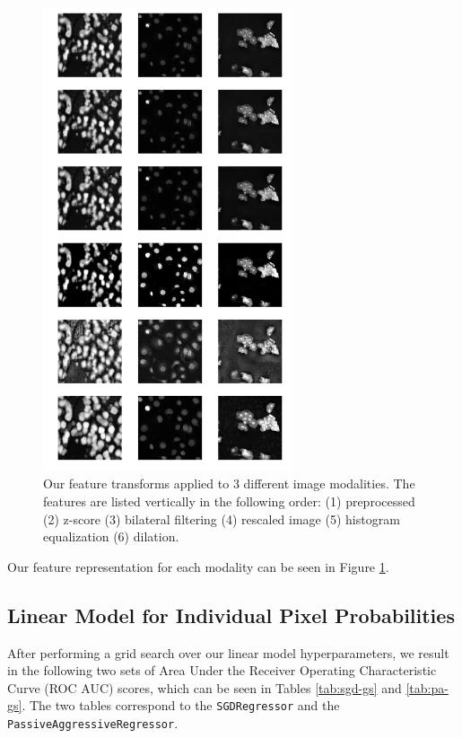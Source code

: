 \documentclass[paper=letter, fontsize=12pt]{article}
\numberwithin{equation}{section} %
\numberwithin{figure}{section} %
\numberwithin{table}{section} %
\begin{document}
\begin{figure}[H]
    \centering
    \includegraphics[width=0.65\textwidth]{./figs/hand-designed-features.png}
    \caption{Our feature transforms applied to 3 different image modalities.  The
    features are listed vertically in the following order: (1) preprocessed (2)
    z-score (3) bilateral filtering (4) rescaled image (5) histogram
    equalization (6) dilation.}
    \label{fig:hand-designed-comparison}
\end{figure}

Our feature representation for each modality can be seen in Figure
\ref{fig:hand-designed-comparison}.

\subsection{Linear Model for Individual Pixel Probabilities}

After performing a grid search over our linear model hyperparameters, we result
in the following two sets of Area Under the Receiver Operating Characteristic
Curve (ROC AUC) scores, which can be seen in Tables \ref{tab:sgd-gs} and
\ref{tab:pa-gs}.  The two tables correspond to the \texttt{SGDRegressor} and
the \texttt{PassiveAggressiveRegressor}.
\end{document}
